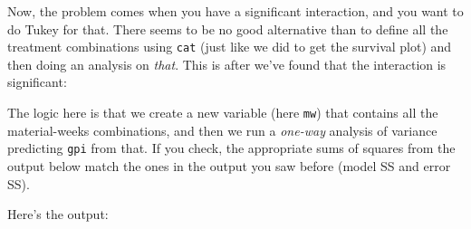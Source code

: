 \documentclass{article}
\begin{document}
Now, the problem comes when you have a significant interaction, and
you want to do Tukey for that. There seems to be no good alternative
than to define all the treatment combinations using \texttt{cat} (just
like we did to get the survival plot) and then doing an analysis on
\emph{that}. This is after we've found that the interaction is significant:


The logic here is that we create a new variable (here \texttt{mw})
that contains all the material-weeks combinations, and then we run a
\emph{one-way} analysis of variance predicting \texttt{gpi} from
that. If you check, the appropriate sums of squares from the output
below match the ones in the output you saw before (model SS and error SS).

Here's the output:
\end{document}
